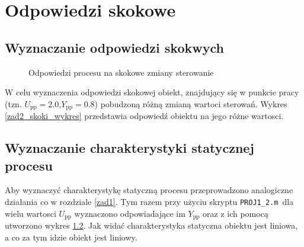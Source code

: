 \chapter{Odpowiedzi skokowe}
\label{zad2}

\section{Wyznaczanie odpowiedzi skokwych}
\label{zad2_skoki}

\begin{figure}[t]
\label{zad2_skoki_wykres}
    \centering
    \caption{Odpowiedzi procesu na skokowe zmiany sterowanie}
    \label{zad2_porow_odp_skok}
\end{figure}

W celu wyznaczenia odpowiedzi skokowej obiekt, znajdujący się w punkcie pracy (tzn. $U_{\mathrm{pp}}= \num{2.0}$,$Y_{\mathrm{pp}}= \num{0.8}$) pobudzoną różną zmianą wartoci sterowań. Wykres \ref{zad2_skoki_wykres} przedstawia odpowiedź obiektu na jego różne wartosci.

\section{Wyznaczanie charakterystyki statycznej procesu}
\label{zad2_char_stat}
Aby wyznaczyć charakterystykę statyczną procesu przeprowadzono analogiczne działania co w rozdziale \ref{zad1}. Tym razem przy użyciu skryptu \verb+PROJ1_2.m +dla wielu wartosci $U_{\mathrm{pp}}$ wyznaczono odpowiadające im $Y_{\mathrm{pp}}$ oraz z ich pomocą utworzono wykres \ref{zad2_char_stat}. Jak widać charakterystyka statyczna obiektu jest liniowa, a co za tym idzie obiekt jest liniowy.

